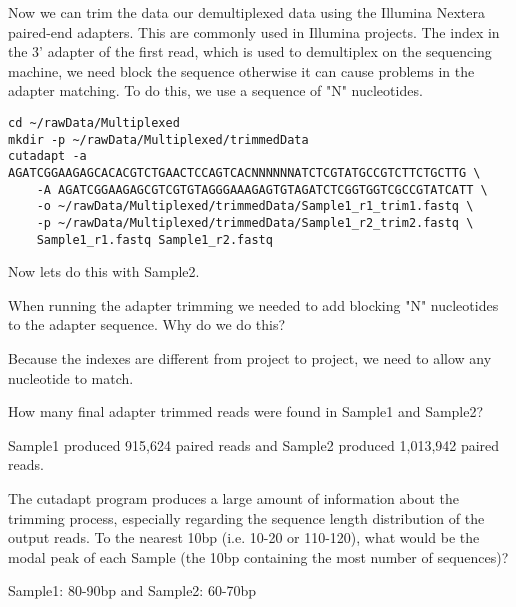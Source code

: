 \begin{steps}
Now we can trim the data our demultiplexed data using the Illumina Nextera paired-end adapters. This are commonly used in Illumina projects. The index in the 3' adapter of the first read, which is used to demultiplex on the sequencing machine, we need block the sequence otherwise it can cause problems in the adapter matching. To do this, we use a sequence of "N" nucleotides.
\end{steps}

\begin{lstlisting}
cd ~/rawData/Multiplexed
mkdir -p ~/rawData/Multiplexed/trimmedData
cutadapt -a AGATCGGAAGAGCACACGTCTGAACTCCAGTCACNNNNNNATCTCGTATGCCGTCTTCTGCTTG \
    -A AGATCGGAAGAGCGTCGTGTAGGGAAAGAGTGTAGATCTCGGTGGTCGCCGTATCATT \
    -o ~/rawData/Multiplexed/trimmedData/Sample1_r1_trim1.fastq \
    -p ~/rawData/Multiplexed/trimmedData/Sample1_r2_trim2.fastq \
    Sample1_r1.fastq Sample1_r2.fastq
\end{lstlisting}

Now lets do this with Sample2.

\begin{questions}
When running the adapter trimming we needed to add blocking "N" nucleotides to the adapter sequence. Why do we do this? \\
\begin{answer}
Because the indexes are different from project to project, we need to allow any nucleotide to match.
\end{answer}
How many final adapter trimmed reads were found in Sample1 and Sample2? \\
\begin{answer}
Sample1 produced 915,624 paired reads and Sample2 produced 1,013,942 paired reads.
\end{answer}
The cutadapt program produces a large amount of information about the trimming process, especially regarding the sequence length distribution of the output reads. To the nearest 10bp (i.e. 10-20 or 110-120), what would be the modal peak of each Sample (the 10bp containing the most number of sequences)?
\begin{answer}
Sample1: 80-90bp and Sample2: 60-70bp
\end{answer}
\end{questions}
